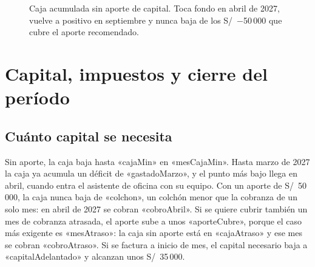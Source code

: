 \documentclass[10.5pt,a4paper]{article}
\begin{document}
\begin{figure}[H]
\caption{Caja acumulada sin aporte de capital. Toca fondo en abril de 2027, vuelve a positivo en septiembre y nunca baja de los S/~−50\,000 que cubre el aporte recomendado.}
\end{figure}

\section{Capital, impuestos y cierre del período}

\subsection{Cuánto capital se necesita}

Sin aporte, la caja baja hasta «cajaMin» en «mesCajaMin». Hasta marzo de 2027 la caja ya acumula un déficit de «gastadoMarzo», y el punto más bajo llega en abril, cuando entra el asistente de oficina con su equipo. Con un aporte de S/~50\,000, la caja nunca baja de «colchon», un colchón menor que la cobranza de un solo mes: en abril de 2027 se cobran «cobroAbril». Si se quiere cubrir también un mes de cobranza atrasada, el aporte sube a unos «aporteCubre», porque el caso más exigente es «mesAtraso»: la caja sin aporte está en «cajaAtraso» y ese mes se cobran «cobroAtraso». Si se factura a inicio de mes, el capital necesario baja a «capitalAdelantado» y alcanzan unos S/~35\,000.
\end{document}
